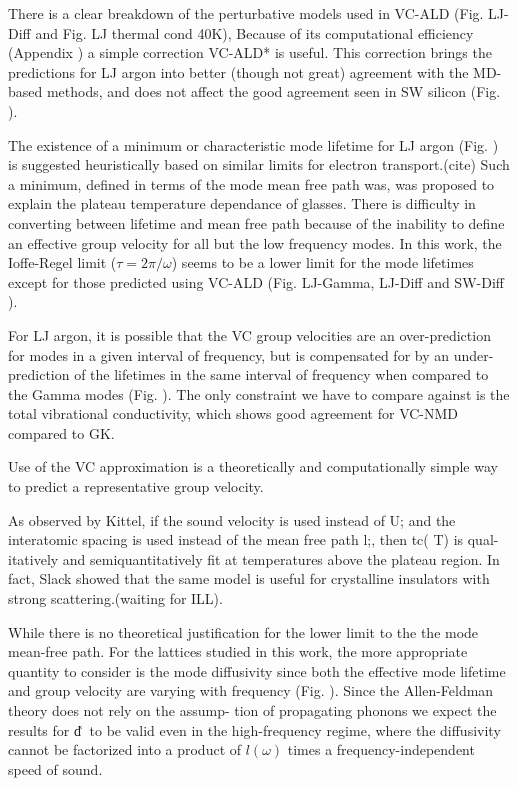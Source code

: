 \documentclass[aps,prb,twocolumn,superscriptaddress,amsmath,amssymb,floatfix]{revtex4}
\begin{document}
There is a clear breakdown of the perturbative models used in  
VC-ALD (Fig. LJ-Diff and Fig. LJ thermal cond 40K), 
Because of its computational efficiency (Appendix ) a simple correction 
VC-ALD* is useful. This correction brings the predictions for LJ argon 
into better (though not great) agreement with the MD-based methods, and 
does not affect the good agreement seen in SW silicon (Fig. ). 

The existence of a minimum or characteristic mode lifetime for 
LJ argon (Fig. ) is suggested heuristically based on similar limits 
for electron transport.(cite) Such a minimum, defined in terms of the mode 
mean free path was, was proposed to explain the plateau 
temperature dependance of glasses.\cite{graebner_phonon_1986} 
There is difficulty in converting 
between lifetime and mean free path because of the inability to 
define an effective group velocity for all but the low frequency modes. 
In this work, the Ioffe-Regel limit ($\tau = 2\pi/\omega $) seems to be 
a lower limit for the mode lifetimes except for those predicted 
using VC-ALD (Fig. LJ-Gamma, LJ-Diff and SW-Diff ). 

For LJ argon, it is possible that the VC group velocities are an over-prediction 
for modes in a given interval of frequency, 
but is compensated for 
by an under-prediction of the lifetimes in the same interval of 
frequency when compared to the Gamma modes (Fig. ). The only constraint 
we have to compare against is the total vibrational conductivity, which 
shows good agreement for VC-NMD compared to GK. 

Use of the VC approximation is a theoretically and 
computationally simple way to predict a representative group velocity.

As observed by Kittel, if the sound
velocity is used instead of U; and the interatomic spacing
is used instead of the mean free path l;, then tc( T) is qual-
itatively and semiquantitatively
fit at temperatures above
the plateau region.
In fact, Slack showed that the same model 
is useful for crystalline insulators with strong scattering.(waiting for 
ILL).\cite{henry_ehrenreich_thermal_1979}

While there is no theoretical justification for 
the lower limit to the the mode mean-free path.\cite{graebner_phonon_1986} 
For the lattices studied in this work, the more appropriate quantity to 
consider is the mode diffusivity since both the 
effective mode lifetime   
and group velocity are varying with frequency (Fig. ). 
Since the Allen-Feldman theory does not rely on the assump-
tion of propagating phonons we expect the results for d͑␻͒
to be valid even in the high-frequency regime, where the
diffusivity cannot be factorized into a product of $l(\omega)$ times
a frequency-independent speed of sound.
\end{document}
